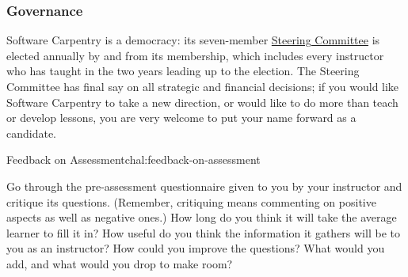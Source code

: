 \subsubsection{Governance}\label{governance}

Software Carpentry is a democracy: its seven-member
\href{\{\{\%20site.swc\_site\%20\}\}/scf/}{Steering Committee} is elected
annually by and from its membership, which includes every instructor who
has taught in the two years leading up to the election. The Steering
Committee has final say on all strategic and financial decisions; if you
would like Software Carpentry to take a new direction, or would like to
do more than teach or develop lessons, you are very welcome to put your
name forward as a candidate.

\begin{challenge}{Feedback on Assessment}{chal:feedback-on-assessment}

Go through the pre-assessment questionnaire given to you by your
instructor and critique its questions. (Remember, critiquing means
commenting on positive aspects as well as negative ones.) How long do
you think it will take the average learner to fill it in? How useful do
you think the information it gathers will be to you as an instructor?
How could you improve the questions? What would you add, and what would
you drop to make room?
\end{challenge}
